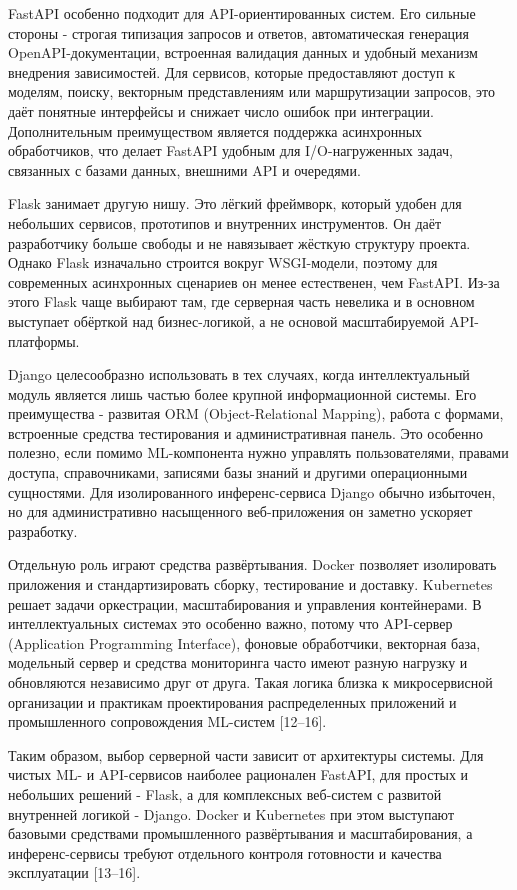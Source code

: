 \documentclass[14pt,a4paper]{extarticle}
\numberwithin{figure}{section}
\numberwithin{table}{section}
\begin{document}
FastAPI особенно подходит для API-ориентированных систем. Его сильные
стороны - строгая типизация запросов и ответов, автоматическая генерация
OpenAPI-документации, встроенная валидация данных и удобный механизм
внедрения зависимостей. Для сервисов, которые предоставляют доступ к
моделям, поиску, векторным представлениям или маршрутизации запросов, это даёт
понятные интерфейсы и снижает число ошибок при интеграции.
Дополнительным преимуществом является поддержка асинхронных
обработчиков, что делает FastAPI удобным для I/O-нагруженных задач,
связанных с базами данных, внешними API и очередями.

Flask занимает другую нишу. Это лёгкий фреймворк, который удобен для
небольших сервисов, прототипов и внутренних инструментов. Он даёт
разработчику больше свободы и не навязывает жёсткую структуру проекта.
Однако Flask изначально строится вокруг WSGI-модели, поэтому для
современных асинхронных сценариев он менее естественен, чем FastAPI.
Из-за этого Flask чаще выбирают там, где серверная часть невелика и в
основном выступает обёрткой над бизнес-логикой, а не основой
масштабируемой API-платформы.

Django целесообразно использовать в тех случаях, когда интеллектуальный
модуль является лишь частью более крупной информационной системы. Его
преимущества - развитая ORM (Object-Relational Mapping), работа с
формами, встроенные средства тестирования и административная панель. Это
особенно полезно, если помимо ML-компонента нужно управлять
пользователями, правами доступа, справочниками, записями базы знаний и
другими операционными сущностями. Для изолированного инференс-сервиса
Django обычно избыточен, но для административно насыщенного
веб-приложения он заметно ускоряет разработку.

Отдельную роль играют средства развёртывания. Docker позволяет
изолировать приложения и стандартизировать сборку, тестирование и
доставку. Kubernetes решает задачи оркестрации, масштабирования и
управления контейнерами. В интеллектуальных системах это особенно важно,
потому что API-сервер (Application Programming Interface), фоновые
обработчики, векторная база, модельный сервер и средства мониторинга
часто имеют разную нагрузку и обновляются независимо друг от друга.
Такая логика близка к микросервисной организации и практикам
проектирования распределенных приложений и промышленного сопровождения
ML-систем [12--16].

Таким образом, выбор серверной части зависит от архитектуры системы. Для
чистых ML- и API-сервисов наиболее рационален FastAPI, для простых и
небольших решений - Flask, а для комплексных веб-систем с развитой
внутренней логикой - Django. Docker и Kubernetes при этом выступают
базовыми средствами промышленного развёртывания и масштабирования, а
инференс-сервисы требуют отдельного контроля готовности и качества
эксплуатации [13--16].
\end{document}
